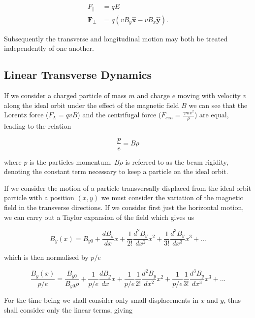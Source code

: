 \begin{align}
F_{\parallel} &= qE \\
\mathbf{F_{\perp}} &= q \left( vB_{y} \mathbf{\hat{x}} - vB_{x} \mathbf{\hat{y}} \right).
\end{align}

Subsequently the transverse and longitudinal motion may both be treated independently of one another.

\subsection{Linear Transverse Dynamics}
\label{sec:linTransMotions}

If we consider a charged particle of mass $m$ and charge $e$ moving with velocity $v$ along the ideal orbit under the effect of the magnetic field $B$ we can see that the Lorentz force ($F_{L} = qvB$) and the centrifugal force ($F_{cen} = \frac{\gamma m v^{2}}{\rho}$) are equal, leading to the relation

\begin{equation}
\frac{p}{e} = B \rho
\label{eqn:beam-rigid}
\end{equation}

where $p$ is the particles momentum. $B \rho$ is referred to as the beam rigidity, denoting the constant term necessary to keep a particle on the ideal orbit. 

If we consider the motion of a particle transversally displaced from the ideal orbit particle with a position $(x, y)$ we must consider the variation of the magnetic field in the transverse directions. If we consider first just the horizontal motion, we can carry out a Taylor expansion of the field which gives us

\begin{equation}
B_{y} \left( x \right) = B_{y0} + \frac{dB_{y}}{dx} x + \frac{1}{2!}\frac{d^{2}B_{y}}{dx^{2}} x^{2} + \frac{1}{3!} \frac{d^{3}B_{y}}{dx^{3}} x^{3} + ...
\end{equation}

which is then normalised by $p/e$

\begin{equation}
\frac{B_{y} \left( x \right)}{p/e} = \frac{B_{y0}}{B_{y0}\rho} + \frac{1}{p/e}\frac{dB_{y}}{dx} x + \frac{1}{p/e}\frac{1}{2!}\frac{d^{2}B_{y}}{dx^{2}} x^{2} + \frac{1}{p/e}\frac{1}{3!} \frac{d^{3}B_{y}}{dx^{3}} x^{3} + ...
\end{equation}

For the time being we shall consider only small displacements in $x$ and $y$, thus shall consider only the linear terms, giving

